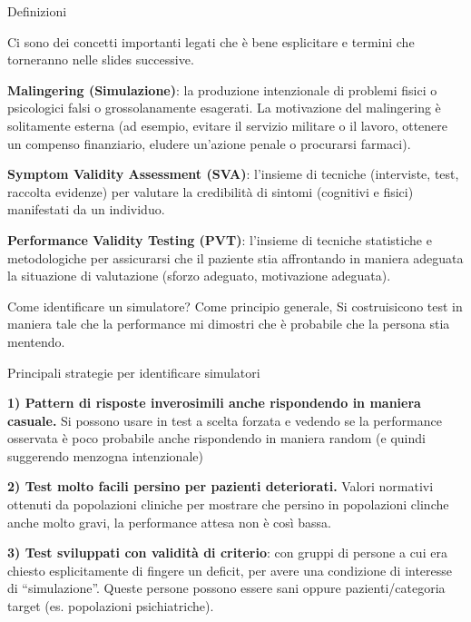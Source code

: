 \documentclass[
  ignorenonframetext,
]{beamer}
\begin{document}
\begin{frame}{Definizioni}
\label{definizioni}
\small

Ci sono dei concetti importanti legati che è bene esplicitare e termini
che torneranno nelle slides successive.

\textbf{Malingering (Simulazione)}: la produzione intenzionale di
problemi fisici o psicologici falsi o grossolanamente esagerati. La
motivazione del malingering è solitamente esterna (ad esempio, evitare
il servizio militare o il lavoro, ottenere un compenso finanziario,
eludere un'azione penale o procurarsi farmaci).

\textbf{Symptom Validity Assessment (SVA)}: l'insieme di tecniche
(interviste, test, raccolta evidenze) per valutare la credibilità di
sintomi (cognitivi e fisici) manifestati da un individuo.

\textbf{Performance Validity Testing (PVT)}: l'insieme di tecniche
statistiche e metodologiche per assicurarsi che il paziente stia
affrontando in maniera adeguata la situazione di valutazione (sforzo
adeguato, motivazione adeguata).
\end{frame}

\begin{frame}{Come identificare un simulatore?}
\label{come-identificare-un-simulatore}
Come principio generale, Si costruisicono test in maniera tale che la
performance mi dimostri che è probabile che la persona stia mentendo.
\end{frame}

\begin{frame}{Principali strategie per identificare simulatori}
\label{principali-strategie-per-identificare-simulatori}
\small

\textbf{1) Pattern di risposte inverosimili anche rispondendo in maniera
casuale.} Si possono usare in test a scelta forzata e vedendo se la
performance osservata è poco probabile anche rispondendo in maniera
random (e quindi suggerendo menzogna intenzionale)

\textbf{2) Test molto facili persino per pazienti deteriorati.} Valori
normativi ottenuti da popolazioni cliniche per mostrare che persino in
popolazioni clinche anche molto gravi, la performance attesa non è così
bassa.

\textbf{3) Test sviluppati con validità di criterio}: con gruppi di
persone a cui era chiesto esplicitamente di fingere un deficit, per
avere una condizione di interesse di ``simulazione''. Queste persone
possono essere sani oppure pazienti/categoria target (es. popolazioni
psichiatriche).
\end{frame}
\end{document}
